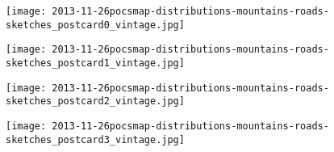 
\begin{frame}
  
\texttt{[image: 2013-11-26pocsmap-distributions-mountains-roads-sketches\_postcard0\_vintage.jpg]}
\end{frame}

\begin{frame}
\texttt{[image: 2013-11-26pocsmap-distributions-mountains-roads-sketches\_postcard1\_vintage.jpg]}
\end{frame}

\begin{frame}
\texttt{[image: 2013-11-26pocsmap-distributions-mountains-roads-sketches\_postcard2\_vintage.jpg]}
\end{frame}

\begin{frame}
\texttt{[image: 2013-11-26pocsmap-distributions-mountains-roads-sketches\_postcard3\_vintage.jpg]}
\end{frame}
